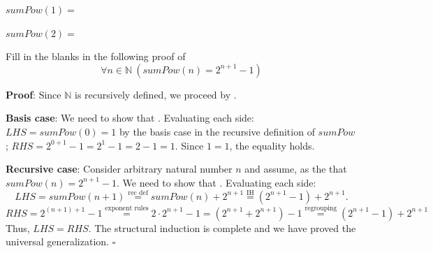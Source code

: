 \documentclass[12pt, oneside]{article}
\begin{document}
$sumPow(1) =$

\vspace{20pt}

$sumPow(2) =$

\vspace{20pt}


Fill in the blanks in the following proof of 
\[
    \forall n \in \mathbb{N}~(sumPow(n) = 2^{n+1} - 1)
\]

{\bf Proof}: Since $\mathbb{N}$ is recursively defined, we proceed by \underline{}.

{\bf Basis case}: We need to show that \underline{}.
Evaluating each side: $LHS = sumPow(0) = 1$ by the basis case in the recursive definition
of $sumPow$; $RHS = 2^{0+1} - 1 = 2^1 - 1 = 2-1 = 1$. Since $1=1$, the equality holds.

{\bf Recursive case}: Consider arbitrary natural number $n$ and assume, as the 
\underline{\phantom{Induction Hypothesis (IH)}} that $sumPow(n) = 2^{n+1} - 1$. We need to show that
\underline{}.  Evaluating each side: 
\[
LHS = sumPow(n+1) \overset{\text{rec def}}{=} sumPow(n)  + 2^{n+1}\overset{\text{IH}}{=} (2^{n+1} - 1) + 2^{n+1}.
\]
\[
RHS = 2^{(n+1)+1}- 1 \overset{\text{exponent rules}}{=} 2 \cdot 2^{n+1} -1  = \left(2^{n+1} + 2^{n+1} \right) - 1
\overset{\text{regrouping}}{=}  (2^{n+1} - 1) + 2^{n+1} 
\]
Thus, $LHS = RHS$. The structural induction is complete and we have proved the universal generalization.
$\square$

 \vfill


 \newpage
\end{document}
